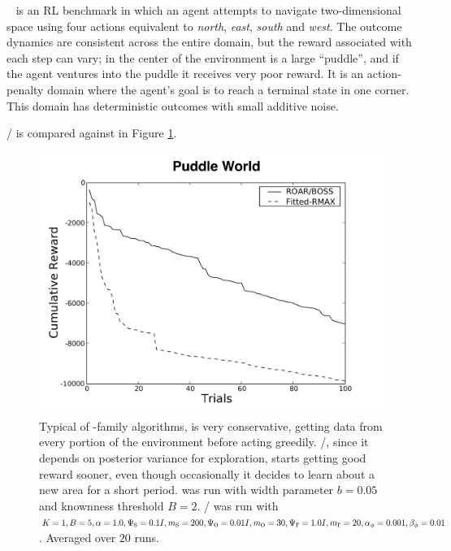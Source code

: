 ~\cite{boyan94b} is an RL benchmark in which an agent attempts to navigate two-dimensional space using four actions equivalent to \emph{north}, \emph{east}, \emph{south} and \emph{west}. The outcome dynamics are consistent across the entire domain, but the reward associated with each step can vary; in the center of the environment is a large ``puddle'', and if the agent ventures into the puddle it receives very poor reward. It is an action-penalty domain where the agent's goal is to reach a terminal state in one corner. This domain has deterministic outcomes with small additive noise.

/ is compared against  in Figure \ref{fig:puddle}.

\begin{figure}[t]
\vskip 0.2in
\begin{center}
\centerline{\includegraphics[width=\columnwidth]{puddleFigure}}
\caption{Typical of -family algorithms,  is very conservative, getting data from every portion of the environment before acting greedily. /, since it depends on posterior variance for exploration, starts getting good reward sooner, even though occasionally it decides to learn about a new area for a short period.  was run with width parameter $b=0.05$ and knownness threshold $B=2$. / was run with $K=1, B=5, \alpha=1.0,\Psi_{\mbox s}=0.1I, m_{\mbox s}=200, \Psi_{\mbox o}=0.01I, m_{\mbox o}=30, \Psi_{\mbox r}=1.0I,m_{\mbox r}=20,\alpha_\phi=0.001,\beta_\phi=0.01$. Averaged over $20$ runs.}
\label{fig:puddle}
\end{center}
\vskip -0.2in
\end{figure} 


